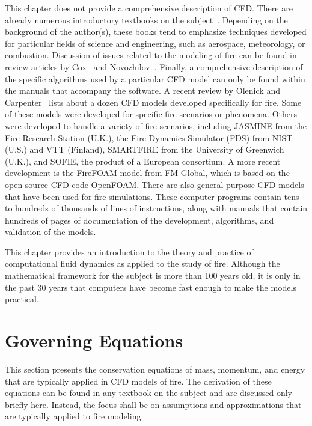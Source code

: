 \documentclass[graybox]{svmult}
\begin{document}
This chapter does not provide a comprehensive description of CFD. There are already numerous introductory textbooks on the subject~\cite{Anderson, Ferziger, Patankar, Peyret, Versteeg}. Depending on the background of the author(s), these books tend to emphasize techniques developed for particular fields of science and engineering, such as aerospace, meteorology, or combustion. Discussion of issues related to the modeling of fire can be found in review articles by Cox~\cite{Cox:1995,Cox:1998}  and Novozhilov~\cite{Novozhilov}. Finally, a comprehensive description of the specific algorithms used by a particular CFD model can only be found within the manuals that accompany the software. A recent review by Olenick and Carpenter~\cite{Olenick} lists about a dozen CFD models developed specifically for fire. Some of these models were developed for specific fire scenarios or phenomena. Others were developed to handle a variety of fire scenarios, including JASMINE from the Fire Research Station (U.K.), the Fire Dynamics Simulator (FDS) from NIST (U.S.) and VTT (Finland), SMARTFIRE from the University of Greenwich (U.K.), and SOFIE, the product of a European consortium. A more recent development is the FireFOAM model from FM Global, which is based on the open source CFD code OpenFOAM. There are also general-purpose CFD models that have been used for fire simulations. These computer programs contain tens to hundreds of thousands of lines of instructions, along with manuals that contain hundreds of pages of documentation of the development, algorithms, and validation of the models.

This chapter provides an introduction to the theory and practice of computational fluid dynamics as applied to the study of fire. Although the mathematical framework for the subject is more than 100 years old, it is only in the past 30 years that computers have become fast enough to make the models practical.


\section{Governing Equations}

This section presents the conservation equations of mass, momentum, and energy that are typically applied in CFD models of fire. The derivation of these equations can be found in any textbook on the subject and are discussed only briefly here. Instead, the focus shall be on assumptions and approximations that are typically applied to fire modeling.
\end{document}
